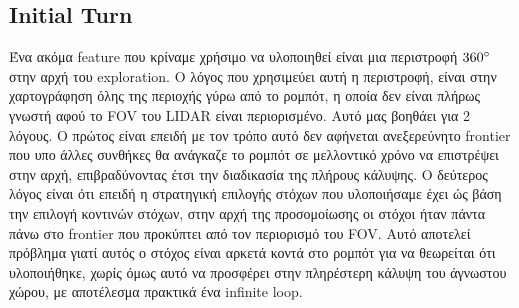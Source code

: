 \subsection*{Initial Turn}
Ένα ακόμα feature που κρίναμε χρήσιμο να υλοποιηθεί είναι μια περιστροφή $360\degree$ στην αρχή του exploration. Ο λόγος που χρησιμεύει αυτή η περιστροφή, είναι στην χαρτογράφηση όλης της περιοχής γύρω από το ρομπότ, η οποία δεν είναι πλήρως γνωστή αφού το FOV του LIDAR είναι περιορισμένο. Αυτό μας βοηθάει για 2 λόγους. Ο πρώτος είναι επειδή με τον τρόπο αυτό δεν αφήνεται ανεξερεύνητο frontier που υπο άλλες συνθήκες θα ανάγκαζε το ρομπότ σε μελλοντικό χρόνο να επιστρέψει στην αρχή, επιβραδύνοντας έτσι την διαδικασία της πλήρους κάλυψης. Ο δεύτερος λόγος είναι ότι επειδή η στρατηγική επιλογής στόχων που υλοποιήσαμε έχει ώς βάση την επιλογή κοντινών στόχων, στην αρχή της προσομοίωσης οι στόχοι ήταν πάντα πάνω στο frontier που προκύπτει από τον περιορισμό του FOV. Αυτό αποτελεί πρόβλημα γιατί αυτός ο στόχος είναι αρκετά κοντά στο ρομπότ για να θεωρείται ότι υλοποιήθηκε, χωρίς όμως αυτό να προσφέρει στην πληρέστερη κάλυψη του άγνωστου χώρου, με αποτέλεσμα πρακτικά ένα infinite loop.
